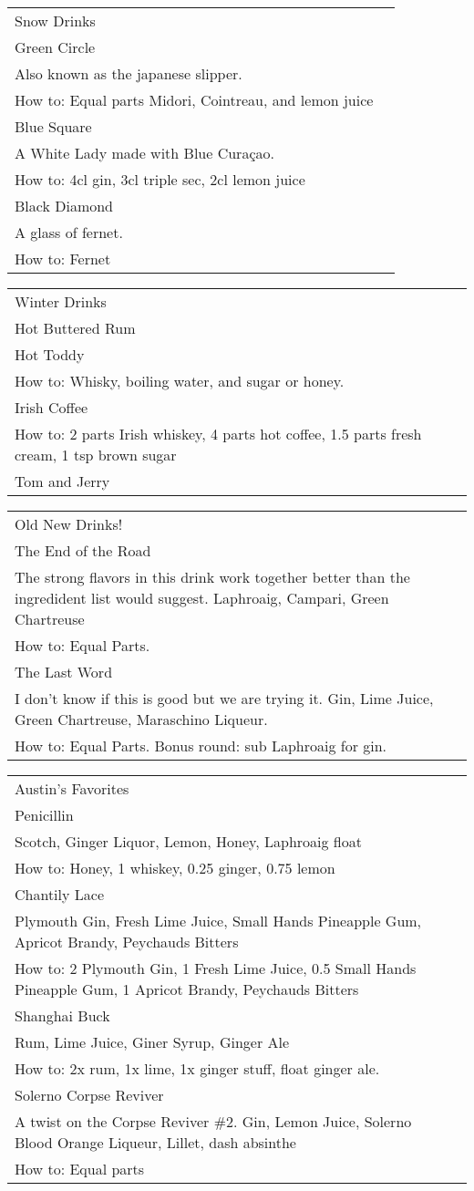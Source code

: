 \documentclass[12pt]{article}
\makeatletter
\newcommand*\ColText[1]{\textcolor{DarkColor}{#1}}
\newenvironment{Group}[1]
  {\noindent\begin{tabular*}{\textwidth}{@{}p{.8\linewidth}@{\extracolsep{\fill}}r@{}}
    {\fontsize{24}{29}\selectfont\ColText{#1}}\\[0.8em]}
  {\end{tabular*}}
\newcommand*\Entry[1]{%
  \sffamily#1 \\
}
\newcommand*\Expl[1]{
  \hspace*{1em}\footnotesize #1 \\
}
\newcommand*\HowTo[1]{
  \hspace*{1em}\footnotesize How to: \hspace*{1em}#1 \\
}
\makeatother
\begin{document}
\begin{Group}{Snow Drinks}

\Entry{Green Circle}
\Expl{Also known as the japanese slipper.}
\HowTo{Equal parts Midori, Cointreau, and lemon juice}

\Entry{Blue Square}
\Expl{A White Lady made with Blue Curaçao.}
\HowTo{4cl gin, 3cl triple sec, 2cl lemon juice}

\Entry{Black Diamond}
\Expl{A glass of fernet.}
\HowTo{Fernet}

\end{Group}

\vfill

\begin{Group}{Winter Drinks}
\Entry{Hot Buttered Rum}

\Entry{Hot Toddy}
\HowTo{Whisky, boiling water, and sugar or honey.}

\Entry{Irish Coffee}
\HowTo{2 parts Irish whiskey, 4 parts hot coffee, 1.5 parts fresh cream, 1 tsp brown sugar}

\Entry{Tom and Jerry}
\end{Group}

\vfill

\begin{Group}{Old New Drinks!}

\Entry{The End of the Road}
\Expl{The strong flavors in this drink work together better than the ingredident list would suggest. Laphroaig, Campari, Green Chartreuse}
\HowTo{Equal Parts.}

\Entry{The Last Word}
\Expl{I don't know if this is good but we are trying it. Gin, Lime Juice, Green Chartreuse, Maraschino Liqueur.}
\HowTo{Equal Parts. Bonus round: sub Laphroaig for gin.}

\end{Group}

\vfill

\begin{Group}{Austin's Favorites}

\Entry{Penicillin}
\Expl{Scotch, Ginger Liquor, Lemon, Honey, Laphroaig float}
\HowTo{Honey, 1 whiskey, 0.25 ginger, 0.75 lemon}

\Entry{Chantily Lace}
\Expl{Plymouth Gin, Fresh Lime Juice, Small Hands Pineapple Gum, Apricot Brandy, Peychauds Bitters}
\HowTo{2 Plymouth Gin, 1 Fresh Lime Juice, 0.5 Small Hands Pineapple Gum, 1 Apricot Brandy, Peychauds Bitters}

\Entry{Shanghai Buck}
\Expl{Rum, Lime Juice, Giner Syrup, Ginger Ale}
\HowTo{2x rum, 1x lime, 1x ginger stuff, float ginger ale.}

\Entry{Solerno Corpse Reviver}
\Expl{A twist on the Corpse Reviver \#2. Gin, Lemon Juice, Solerno Blood Orange Liqueur, Lillet, dash absinthe}
\HowTo{Equal parts}

\end{Group}
\end{document}

